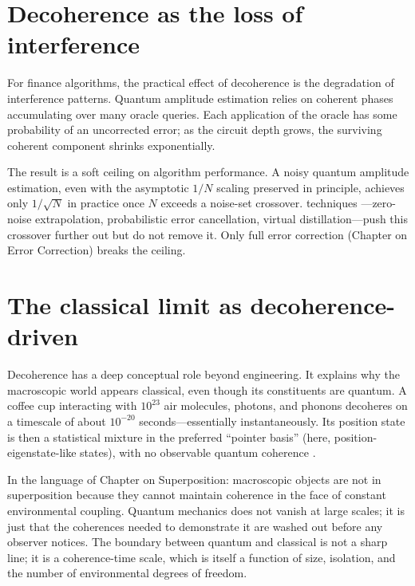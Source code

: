 \section{Decoherence as the loss of interference}

For finance algorithms, the practical effect of decoherence is the degradation of interference patterns. Quantum amplitude estimation relies on coherent phases accumulating over many oracle queries. Each application of the oracle has some probability of an uncorrected error; as the circuit depth grows, the surviving coherent component shrinks exponentially.

The result is a soft ceiling on algorithm performance. A noisy quantum amplitude estimation, even with the asymptotic $1/N$ scaling preserved in principle, achieves only $1/\sqrt{N}$ in practice once $N$ exceeds a noise-set crossover.  techniques \citep{temme_error_2017,kim_evidence_2023}---zero-noise extrapolation, probabilistic error cancellation, virtual distillation---push this crossover further out but do not remove it. Only full error correction (Chapter on Error Correction) breaks the ceiling.

\section{The classical limit as decoherence-driven}

Decoherence has a deep conceptual role beyond engineering. It explains why the macroscopic world appears classical, even though its constituents are quantum. A coffee cup interacting with $10^{23}$ air molecules, photons, and phonons decoheres on a timescale of about $10^{-20}$ seconds---essentially instantaneously. Its position state is then a statistical mixture in the preferred ``pointer basis'' (here, position-eigenstate-like states), with no observable quantum coherence \citep{zurek_decoherence_2003}.

In the language of Chapter on Superposition: macroscopic objects are not in superposition because they cannot maintain coherence in the face of constant environmental coupling. Quantum mechanics does not vanish at large scales; it is just that the coherences needed to demonstrate it are washed out before any observer notices. The boundary between quantum and classical is not a sharp line; it is a coherence-time scale, which is itself a function of size, isolation, and the number of environmental degrees of freedom.

